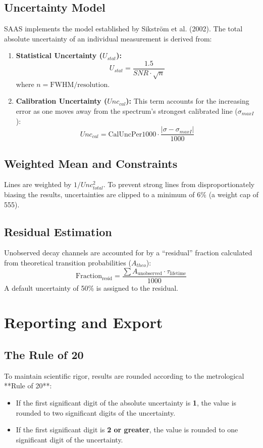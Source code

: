 \documentclass[11pt,a4paper]{article}
\begin{document}
\subsection{Uncertainty Model}
SAAS implements the model established by Sikström et al. (2002). The total absolute uncertainty of an individual measurement is derived from:
\begin{enumerate}
    \item \textbf{Statistical Uncertainty ($U_{stat}$):} 
    \begin{equation}
        U_{stat} = \frac{1.5}{SNR \cdot \sqrt{n}}
    \end{equation}
    where $n = \text{FWHM} / \text{resolution}$.
    \item \textbf{Calibration Uncertainty ($Unc_{cal}$):} This term accounts for the increasing error as one moves away from the spectrum's strongest calibrated line ($\sigma_{maxI}$):
    \begin{equation}
        Unc_{cal} = \text{CalUncPer1000} \cdot \frac{|\sigma - \sigma_{maxI}|}{1000}
    \end{equation}
\end{enumerate}

\subsection{Weighted Mean and Constraints}
Lines are weighted by $1/Unc_{total}^2$. To prevent strong lines from disproportionately biasing the results, uncertainties are clipped to a minimum of 6\% (a weight cap of 555).

\subsection{Residual Estimation}
Unobserved decay channels are accounted for by a ``residual'' fraction calculated from theoretical transition probabilities ($A_{theo}$):
\begin{equation}
    \text{Fraction}_{\text{resid}} = \frac{\sum A_{\text{unobserved}} \cdot \tau_{\text{lifetime}}}{1000}
\end{equation}
A default uncertainty of 50\% is assigned to the residual.

\section{Reporting and Export}
\subsection{The Rule of 20}
To maintain scientific rigor, results are rounded according to the metrological **Rule of 20**:
\begin{itemize}
    \item If the first significant digit of the absolute uncertainty is \textbf{1}, the value is rounded to two significant digits of the uncertainty.
    \item If the first significant digit is \textbf{2 or greater}, the value is rounded to one significant digit of the uncertainty.
\end{itemize}
\end{document}
